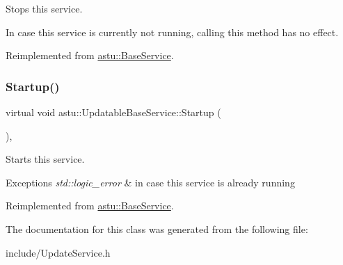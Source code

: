 Stops this service.

In case this service is currently not running, calling this method has no effect. 

Reimplemented from \hyperlink{classastu_1_1BaseService_a7095888244052db294d58738c0d187fb}{astu\+::\+Base\+Service}.

\mbox{\label{classastu_1_1UpdatableBaseService_a47e3725f717cee3cd8983f485b2a0243}} 
\subsubsection{\texorpdfstring{Startup()}{Startup()}}
{\footnotesize\ttfamily virtual void astu\+::\+Updatable\+Base\+Service\+::\+Startup (\begin{DoxyParamCaption}{ }\end{DoxyParamCaption})\hspace{0.3cm}{\ttfamily [override]}, {\ttfamily [virtual]}}

Starts this service.


\begin{DoxyExceptions}{Exceptions}
{\em std\+::logic\+\_\+error} & in case this service is already running \\
\hline
\end{DoxyExceptions}


Reimplemented from \hyperlink{classastu_1_1BaseService_a59dade033dcb44dd32155c526a3a58e2}{astu\+::\+Base\+Service}.



The documentation for this class was generated from the following file\+:\begin{DoxyCompactItemize}
\item 
include/Update\+Service.\+h\end{DoxyCompactItemize}
